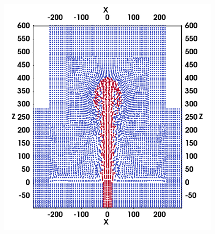 \begin{figure}
\begin{minipage}[t]{.325\textwidth}
        \includegraphics[width=0.99 \textwidth]{./Chapter-4/Figures/RSPH-t1p5-cutView}
    \end{minipage}%
    \\
    \centering
    \begin{minipage}[t]{.325 \textwidth}
        \centering

\end{minipage}
\end{figure}
